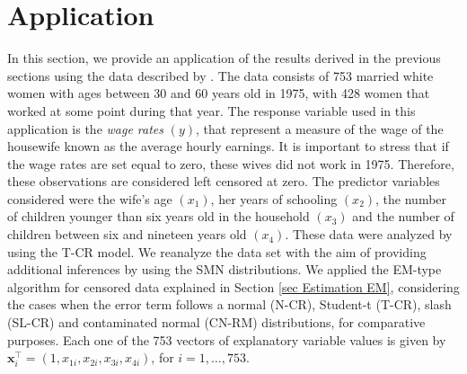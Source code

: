 \section{Application} \label{sec application}
In this section, we provide an application of the results derived in
the previous sections using the data described by \cite{Mroz1987}.
The data consists of 753 married white women with ages between 30
and 60 years old in 1975, with 428 women that worked at some point
during that year. The response variable used in this application is
the \textit{wage rates} $\left(y\right)$, that represent a measure
of the wage of the housewife known as the average hourly earnings.
It is important to stress that if the wage rates are set equal to
zero, these wives did not work in 1975. Therefore, these
observations are considered left censored at zero. The predictor
variables considered were the wife's age $\left(x_1\right)$, her
years of schooling $\left(x_2\right)$, the number of children
younger than six years old in the household $\left(x_3\right)$ and
the number of children between six and nineteen years old
$\left(x_4\right)$. These data were analyzed by \cite{Arellano2012}
using the T-CR model. We reanalyze the data set with the aim of
providing additional inferences by using the SMN distributions. We
applied  the EM-type algorithm for censored data explained in
Section \ref{sec Estimation EM}, considering the cases when the
error term follows a normal (N-CR), Student-t (T-CR), slash (SL-CR)
and contaminated normal (CN-RM) distributions, for comparative
purposes. Each one of the 753 vectors of explanatory variable
values is given by $\mathbf{x}^{\top}_i=(1,x_{1i},x_{2i},x_{3i},x_{4i})$, for $i=1,\ldots,753$.\\
